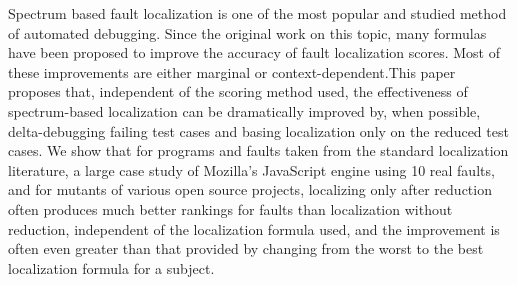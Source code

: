 Spectrum based fault localization is one of the most popular and studied method of automated debugging. Since the original work on this topic, many formulas have been proposed to improve the accuracy of fault localization scores. Most of these improvements are either marginal or context-dependent.This paper proposes that, independent of the scoring method used, the effectiveness of spectrum-based localization can be dramatically improved by, when possible, delta-debugging failing test cases and basing localization only on the reduced test cases. We show that for programs and faults taken from the standard localization literature, a large case study of Mozilla’s JavaScript engine using 10 real faults, and for mutants of various open source projects, localizing only after reduction often produces much better rankings for faults than localization without reduction, independent of the localization formula used, and the improvement is often even greater than that provided by changing from the worst to the best localization formula for a subject.